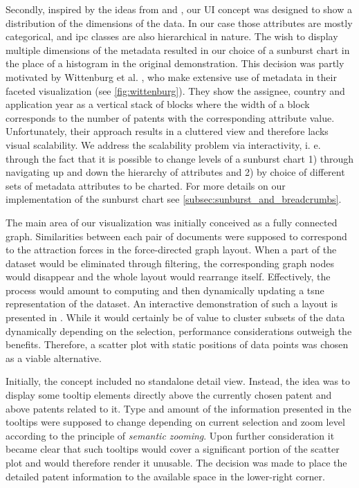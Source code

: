 Secondly, inspired by the ideas from \cite{Johnson2018} and \cite{Wittenburg2015}, our UI concept was designed to show a distribution of the dimensions of the data.
In our case those attributes are mostly categorical, and \gls{ipc} classes are also hierarchical in nature.
The wish to display multiple dimensions of the metadata resulted in our choice of a sunburst chart in the place of a histogram in the original demonstration.
This decision was partly motivated by Wittenburg et al. \cite{Wittenburg2015}, who make extensive use of metadata in their faceted visualization (see \autoref{fig:wittenburg}).
They show the assignee, country and application year as a vertical stack of blocks where the width of a block corresponds to the number of patents with the corresponding attribute value. 
Unfortunately, their approach results in a cluttered view and therefore lacks visual scalability.
We address the scalability problem via interactivity, i. e. through the fact that it is possible to change levels of a sunburst chart 1) through navigating up and down the hierarchy of attributes and 2) by choice of different sets of metadata attributes to be charted.
For more details on our implementation of the sunburst chart see \autoref{subsec:sunburst_and_breadcrumbs}.

The main area of our visualization was initially conceived as a fully connected graph.
Similarities between each pair of documents were supposed to correspond to the attraction forces in the force-directed graph layout.
When a part of the dataset would be eliminated through filtering, the corresponding graph nodes would disappear and the whole layout would rearrange itself.
Effectively, the process would amount to computing and then dynamically updating a \gls{tsne} representation of the dataset. 
An interactive demonstration of such a layout is presented in \cite{Strayer2018}.
While it would certainly be of value to cluster subsets of the data dynamically depending on the selection, performance considerations outweigh the benefits.
Therefore, a scatter plot with static positions of data points was chosen as a viable alternative.

Initially, the concept included no standalone detail view.
Instead, the idea was to display some tooltip elements directly above the currently chosen patent and above patents related to it.
Type and amount of the information presented in the tooltips were supposed to change depending on current selection and zoom level according to the principle of \textit{semantic zooming}.
Upon further consideration it became clear that such tooltips would cover a significant portion of the scatter plot and would therefore render it unusable.
The decision was made to place the detailed patent information to the available space in the lower-right corner.

